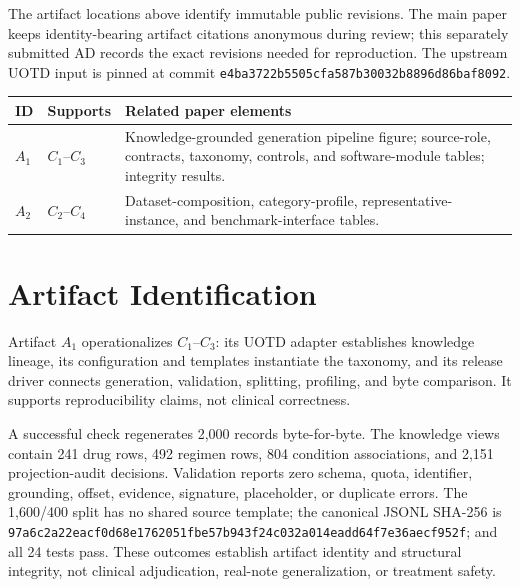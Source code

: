 \documentclass[conference]{IEEEtran}
\newcommand{\UOTDCommitA}{\texttt{e4ba3722b5505cfa587b}}
\newcommand{\UOTDCommitB}{\texttt{30032b8896d86baf8092}}
\newcommand{\ReleaseHashA}{\texttt{97a6c2a22eacf0d68e1762051fbe57b9}}
\newcommand{\ReleaseHashB}{\texttt{43f24c032a014eadd64f7e36aecf952f}}
\begin{document}
The artifact locations above identify immutable public revisions. The main
paper keeps identity-bearing artifact citations anonymous during review; this
separately submitted AD records the exact revisions needed for reproduction.
The upstream UOTD input is pinned at commit
\UOTDCommitA\allowbreak\UOTDCommitB.

\begin{center}
\footnotesize
\begin{tabular}{@{}p{}p{}p{}@{}}
\toprule
\textbf{ID} & \textbf{Supports} & \textbf{Related paper elements} \\
\midrule
$A_1$ & $C_1$--$C_3$ & Knowledge-grounded generation pipeline figure;
source-role, contracts, taxonomy, controls, and software-module tables;
integrity results. \\
\addlinespace
$A_2$ & $C_2$--$C_4$ & Dataset-composition, category-profile,
representative-instance, and benchmark-interface tables. \\
\bottomrule
\end{tabular}
\end{center}

\section{Artifact Identification}

\newartifact

\artrel

Artifact $A_1$ operationalizes $C_1$--$C_3$: its UOTD adapter establishes
knowledge lineage, its configuration and templates instantiate the taxonomy,
and its release driver connects generation, validation, splitting, profiling,
and byte comparison.  It supports reproducibility claims, not clinical
correctness.

\artexp

A successful check regenerates 2,000 records byte-for-byte.  The knowledge
views contain 241 drug rows, 492 regimen rows, 804 condition associations, and
2,151 projection-audit decisions.  Validation reports zero schema, quota,
identifier, grounding, offset, evidence, signature, placeholder, or duplicate
errors.  The 1,600/400 split has no shared source template; the canonical
JSONL SHA-256 is \ReleaseHashA\allowbreak\ReleaseHashB; and all 24 tests pass.
These outcomes establish artifact identity and structural integrity, not
clinical adjudication, real-note generalization, or treatment safety.
\end{document}
